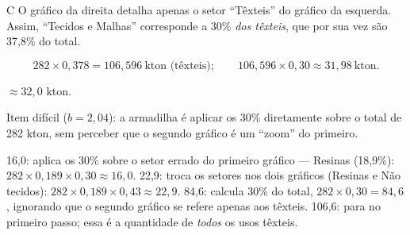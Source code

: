 \begin{resolucao}{C}
 O gráfico da direita detalha apenas o setor “Têxteis” do gráfico da esquerda. Assim, “Tecidos e Malhas” corresponde a 30\% \emph{dos têxteis}, que por sua vez são 37,8\% do total.

\[
282\times0{,}378=106{,}596\ \text{kton (têxteis)};\qquad
106{,}596\times0{,}30\approx31{,}98\ \text{kton}.
\]

 $\approx32{,}0$ kton.


Item difícil ($b=2{,}04$): a armadilha é aplicar os 30\% diretamente sobre o total de 282 kton, sem perceber que o segundo gráfico é um “zoom” do primeiro.
\begin{distratores}
 16,0: aplica os 30\% sobre o setor errado do primeiro gráfico — Resinas (18,9\%): $282\times0{,}189\times0{,}30\approx16{,}0$.
 22,9: troca os setores nos dois gráficos (Resinas e Não tecidos): $282\times0{,}189\times0{,}43\approx22{,}9$.
 84,6: calcula 30\% do total, $282\times0{,}30=84{,}6$, ignorando que o segundo gráfico se refere apenas aos têxteis.
 106,6: para no primeiro passo; essa é a quantidade de \emph{todos} os usos têxteis.
\end{distratores}
\end{resolucao}

